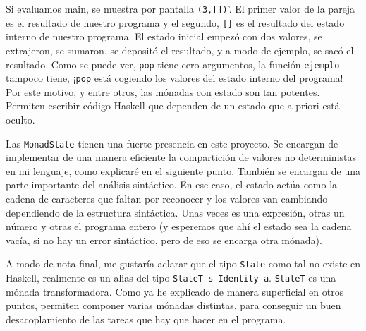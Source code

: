 \documentclass[class=article, crop=false]{standalone}
\begin{document}
Si evaluamos main, se muestra por pantalla \verb`(3,[])`'. El primer valor de la pareja es el
resultado de nuestro programa y el segundo, \verb`[]` es el resultado del estado interno de
nuestro programa. El estado inicial empezó con dos valores, se extrajeron, se sumaron, se
depositó el resultado, y a modo de ejemplo, se sacó el resultado. Como se puede ver,
\verb`pop` tiene cero argumentos, la función \verb`ejemplo` tampoco tiene, ¡\verb`pop` está
cogiendo los valores del estado interno del programa! Por este motivo, y entre otros, las
mónadas con estado son tan potentes. Permiten escribir código Haskell que dependen de un
estado que a priori está oculto.

Las \verb`MonadState` tienen una fuerte presencia en este proyecto. Se encargan de
implementar de una manera eficiente la compartición de valores no deterministas en mi
lenguaje, como explicaré en el siguiente punto. También se encargan de una parte importante
del análisis sintáctico. En ese caso, el estado actúa como la cadena de caracteres que faltan
por reconocer y los valores van cambiando dependiendo de la estructura sintáctica. Unas veces
es una expresión, otras un número y otras el programa entero (y esperemos que ahí el estado
sea la cadena vacía, si no hay un error sintáctico, pero de eso se encarga otra mónada).

A modo de nota final, me gustaría aclarar que el tipo \verb`State` como tal no existe
en Haskell, realmente es un alias del tipo \verb`StateT s Identity a`. \verb`StateT` es una
mónada transformadora. Como ya he explicado de manera superficial en otros puntos, permiten
componer varias mónadas distintas, para conseguir un buen desacoplamiento de las tareas que
hay que hacer en el programa.
\end{document}
